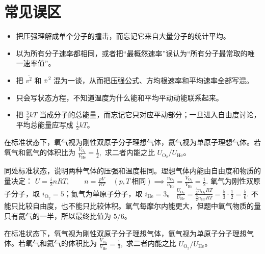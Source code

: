 \documentclass[lang=cn,11pt]{elegantbook}
\begin{document}
\section{常见误区}

\begin{itemize}
 \item 把压强理解成单个分子的撞击，而忘记它来自大量分子的统计平均。
 \item 以为所有分子速率都相同，或者把“最概然速率”误认为“所有分子最常取的唯一速率值”。
 \item 把 \(\overline{v^2}\) 和 \(\bar v^{\,2}\) 混为一谈，从而把压强公式、方均根速率和平均速率全部写混。
 \item 只会写状态方程，不知道温度为什么能和平均平动动能联系起来。
 \item 把 \(\frac32 kT\) 当成分子的总能量，而忘记它只对应平动部分；一旦进入自由度讨论，平均总能量应写成 \(\frac{i}{2}kT\)。
\end{itemize}

\begin{exercise}
在标准状态下，氧气视为刚性双原子分子理想气体，氦气视为单原子理想气体。若氧气和氦气的体积比为
 \(\frac{V_{\mathrm{O_2}}}{V_{\mathrm{He}}}=\frac12,\) 
求二者内能之比 \(U_{\mathrm{O_2}}/U_{\mathrm{He}}\)。
\end{exercise}

\begin{solution}
同处标准状态，说明两种气体的压强和温度相同。理想气体内能由自由度和物质的量决定：
 \(U=\frac{i}{2}nRT,\qquad n=\frac{pV}{RT}\quad(p,T\ \text{相同}) \implies \frac{n_{\mathrm{O_2}}}{n_{\mathrm{He}}} =\frac{V_{\mathrm{O_2}}}{V_{\mathrm{He}}} =\frac12.\) 
氧气为刚性双原子分子，取 \(i_{\mathrm{O_2}}=5\)；氦气为单原子分子，取 \(i_{\mathrm{He}}=3\)。
 \(\frac{U_{\mathrm{O_2}}}{U_{\mathrm{He}}} =\frac{\frac52 n_{\mathrm{O_2}}RT}{\frac32 n_{\mathrm{He}}RT} =\frac{5}{3}\cdot\frac12 =\frac56.\) 
不能只比较自由度，也不能只比较体积。氧气每摩尔内能更大，但题中氧气物质的量只有氦气的一半，所以最终比值为 \(5/6\)。
\end{solution}

\begin{exercise}
在标准状态下，氧气视为刚性双原子分子理想气体，氦气视为单原子分子理想气体。若氧气和氦气的体积比为
 \(\frac{V_{\mathrm{O_2}}}{V_{\mathrm{He}}}=\frac13,\) 
求二者内能之比 \(U_{\mathrm{O_2}}/U_{\mathrm{He}}\)。
\end{exercise}
\end{document}
